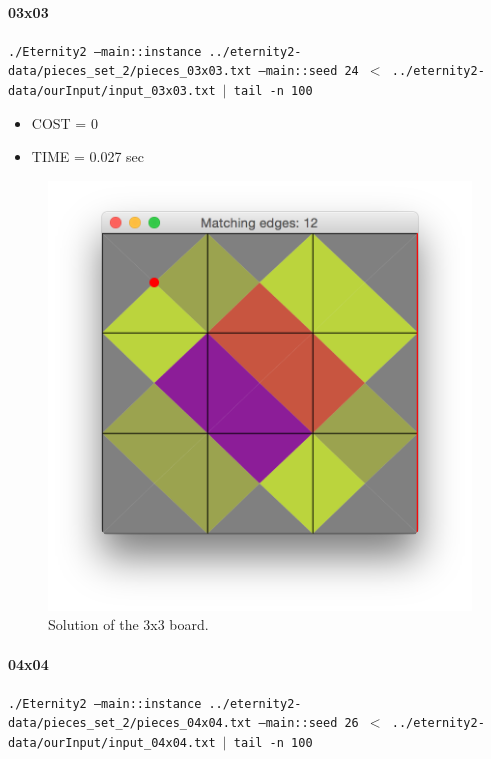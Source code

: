 	\paragraph{03x03}
	\texttt{./Eternity2 --main::instance ../eternity2-data/pieces\_set\_2/pieces\_03x03.txt --main::seed 24 $<$ ../eternity2-data/ourInput/input\_03x03.txt $\mid$ tail -n 100}

	\begin{itemize}
		\item COST = 0
		\item TIME = 0.027 sec
	\end{itemize}
	\begin{figure}[H]
	\centering
	\includegraphics[scale=0.25]{img/sol_03x03}
	\caption{Solution of the 3x3 board.}
	\end{figure}



	\paragraph{04x04}
	\texttt{./Eternity2 --main::instance ../eternity2-data/pieces\_set\_2/pieces\_04x04.txt --main::seed 26 $<$ ../eternity2-data/ourInput/input\_04x04.txt $\mid$ tail -n 100}

